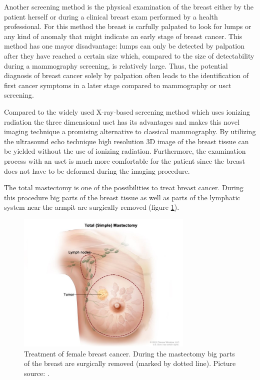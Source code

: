 Another screening method is the physical examination of the breast either by the patient herself or during a clinical breast exam performed by a health professional. For this method the breast is carfully palpated to look for lumps or any kind of anomaly that might indicate an early stage of breast cancer. This method has one mayor disadvantage: lumps can only be detected by palpation after they have reached a certain size which, compared to the size of detectability during a mammography screening, is relatively large. Thus, the potential diagnosis of breast cancer solely by palpation often leads to the identification of first cancer symptoms in a later stage compared to mammography or \ac{usct} screening.   


Compared to the widely used X-ray-based screening method which uses ionizing radiation the three dimensional \ac{usct} has its advantages and makes this novel imaging technique a promising alternative to classical mammography. By utilizing the ultrasound echo technique high resolution 3D image of the breast tissue can be yielded without the use of ionizing radiation. Furthermore, the examination process with an \ac{usct} is much more comfortable for the patient since the breast does not have to be deformed during the imaging procedure. 




The total mastectomy is one of the possibilities to treat breast cancer. During this procedure big parts of the breast tissue as well as parts of the lymphatic system near the armpit are surgically removed (figure \ref{mastecto_example_picture}).  


\begin{figure}[H]
    \centering
    \includegraphics[width=0.75\textwidth]{Graphics/Mastectomy.jpg}
    \caption{Treatment of female breast cancer. During the mastectomy big parts of the breast are surgically removed (marked by dotted line). Picture source: \cite{NationalInstitutesofHealthNIH-NationalCancerInstituteNCIBreastTreatment}. }
    \label{mastecto_example_picture}
\end{figure}

